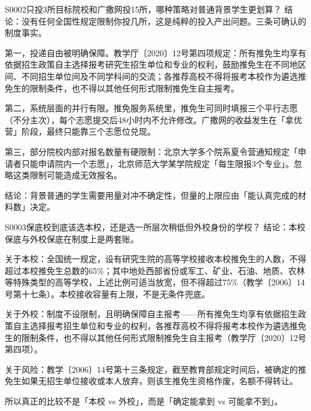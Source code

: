 \begin{qa}{S0002}{只投3所目标院校和广撒网投15所，哪种策略对普通背景学生更划算？}
结论：没有任何全国性规定限制你投几所，这是纯粹的投入产出问题。三条可确认的制度事实。

第一，投递自由被明确保障。教学厅〔2020〕12号第四项规定：所有推免生均享有依据招生政策自主选择报考研究生招生单位和专业的权利，鼓励推免生在不同地区间、不同招生单位间及不同学科间的交流；各推荐高校不得将报考本校作为遴选推免生的限制条件，也不得以其他任何形式限制推免生自主报考。

第二，系统层面的并行有限。推免服务系统里，推免生可同时填报三个平行志愿（不分主次），每个志愿提交后48小时内不允许修改。广撒网的收益发生在「拿优营」阶段，最终只能靠三个志愿位兑现。

第三，部分院校内部对报名数量有硬限制：北京大学多个院系夏令营通知规定「申请者只能申请院内一个志愿」，北京师范大学某学院规定「每生限报3个专业」。忽略这类限制可能造成无效报名。

结论：背景普通的学生需要用量对冲不确定性，但量的上限应由「能认真完成的材料数」决定。
\end{qa}

\begin{qa}{S0003}{保底校到底该选本校，还是选一所层次稍低但外校身份的学校？}
结论：本校保底与外校保底在制度上是两套账。

关于本校：全国统一规定，设有研究生院的高等学校接收本校推免生的人数，不得超过本校推免生总数的65\%；其中地处西部省份或军工、矿业、石油、地质、农林等特殊类型的高等学校，上述比例可适当放宽，但不得超过75\%（教学〔2006〕14号第十七条）。本校接收容量有上限，不是无条件兜底。

关于外校：制度不设限制，且明确保障自主报考——所有推免生均享有依据招生政策自主选择报考招生单位和专业的权利，各推荐高校不得将报考本校作为遴选推免生的限制条件，也不得以其他任何形式限制推免生自主报考（教学厅〔2020〕12号第四项）。

关于风险：教学〔2006〕14号第十三条规定，截至教育部规定时间后，被确定的推免生如果无招生单位接收或本人放弃，则该生推免生资格作废，名额不得转让。

所以真正的比较不是「本校 vs 外校」，而是「确定能拿到 vs 可能拿不到」。
\end{qa}

